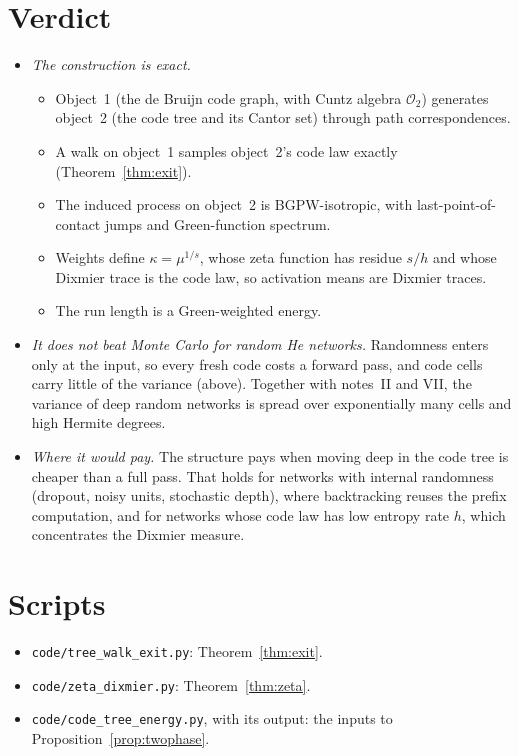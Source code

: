 \documentclass[11pt]{article}
\theoremstyle{definition}
\theoremstyle{remark}
\begin{document}
\section{Verdict}
\begin{itemize}
\item \emph{The construction is exact.}
\begin{itemize}
\item Object~1 (the de Bruijn code graph, with Cuntz algebra $\mathcal O_2$) generates object~2 (the code tree and its Cantor set) through path correspondences.
\item A walk on object~1 samples object~2's code law exactly (Theorem~\ref{thm:exit}).
\item The induced process on object~2 is BGPW-isotropic, with last-point-of-contact jumps and Green-function spectrum.
\item Weights define $\kappa=\mu^{1/s}$, whose zeta function has residue $s/h$ and whose Dixmier trace is the code law, so activation means are Dixmier traces.
\item The run length is a Green-weighted energy.
\end{itemize}
\item \emph{It does not beat Monte Carlo for random He networks.} Randomness enters only at the input, so every fresh code costs a forward pass, and code cells carry little of the variance (above). Together with notes~II and VII, the variance of deep random networks is spread over exponentially many cells and high Hermite degrees.
\item \emph{Where it would pay.} The structure pays when moving deep in the code tree is cheaper than a full pass. That holds for networks with internal randomness (dropout, noisy units, stochastic depth), where backtracking reuses the prefix computation, and for networks whose code law has low entropy rate $h$, which concentrates the Dixmier measure.
\end{itemize}

\appendix
\section{Scripts}
\begin{itemize}
\item \texttt{code/tree\_walk\_exit.py}: Theorem~\ref{thm:exit}.
\item \texttt{code/zeta\_dixmier.py}: Theorem~\ref{thm:zeta}.
\item \texttt{code/code\_tree\_energy.py}, with its output: the inputs to Proposition~\ref{prop:twophase}.
\end{itemize}
\end{document}
